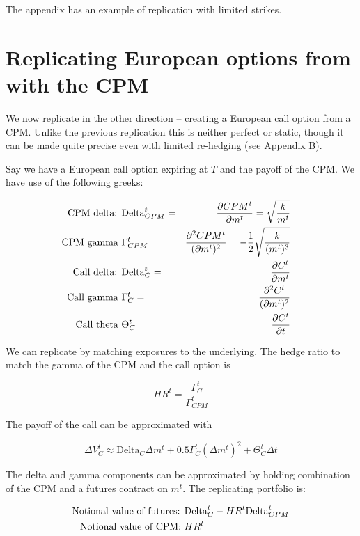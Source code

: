 \documentclass[12pt]{article}
\begin{document}
The appendix has an example of replication with limited strikes.


\section{Replicating European options from with the CPM}

We now replicate in the other direction -- creating a European call option from a CPM. Unlike the previous replication this is neither perfect or static, though it can be made quite precise even with limited re-hedging (see Appendix B).

Say we have a European call option expiring at $T$ and the payoff of the CPM. We have use of the following greeks:

\begin{eqnarray*}
\hbox{CPM delta:   }& \text{Delta}_{CPM}^t =& \frac{\partial CPM^t }{\partial m^t} =  \sqrt{\frac{k}{m^t}}\\
\hbox{CPM gamma   }& \Gamma_{CPM}^t =& \frac{\partial^2 CPM^t }{(\partial m^t)^2} = -  \frac{1}{2} \sqrt{\frac{ k}{(m^t)^3}}\\ 
\hbox{Call delta:   }& \text{Delta}_{C}^t =&  \frac{\partial C^t }{\partial m^t}  & \\
\hbox{Call gamma   }& \Gamma_{C}^t  =& \frac{\partial^2 C^t }{(\partial m^t)^2} & \\
\hbox{Call theta   }& \Theta_{C}^t =& \frac{\partial C^t }{\partial t}  & 

\end{eqnarray*}

 We can replicate by matching exposures to the underlying. The hedge ratio to match the gamma of the CPM and the call option is 

\[HR^t = \frac{\Gamma_C^t}{\Gamma_{CPM}^t} \]

The payoff of the call can be approximated with  

\begin{equation}
\label{VC}
\Delta V_C^t \approx \text{Delta}_C \Delta m^t + 0.5 \Gamma_C^t (\Delta m^t)^2   + \Theta_C^t \Delta t    
\end{equation}


The delta and gamma components can be approximated by holding combination of the CPM and a futures contract on $m^t$. The replicating portfolio is:


\begin{eqnarray*}
\hbox{Notional value of futures:   }& \text{Delta}_C^t - HR^t \text{Delta}_{CPM}^t \\
\hbox{Notional value of CPM:   }& HR^t
\end{eqnarray*}
\end{document}
